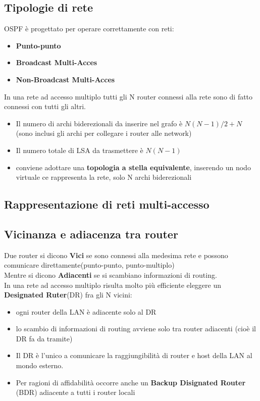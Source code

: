 \documentclass{report}
\begin{document}
            \subsection{Tipologie di rete}
                OSPF è progettato per operare correttamente con reti:
                \begin{itemize}
                    \item \textbf{Punto-punto}
                    \item \textbf{Broadcast Multi-Acces}
                    \item \textbf{Non-Broadcast Multi-Acces}
                \end{itemize}
                In una rete ad accesso multiplo tutti gli N router connessi alla rete sono di fatto connessi con tutti gli altri.
                \begin{itemize}
                    \item Il numero di archi biderezionali da inserire nel grafo è $N(N-1)/2+N$ (sono inclusi gli archi per collegare i router alle network) 
                    \item Il numero totale di LSA da trasmettere è $N(N-1)$
                    \item conviene adottare una \textbf{topologia a stella equivalente}, inserendo un nodo virtuale ce rappresenta la rete, solo N archi biderezionali
                \end{itemize}
            \subsection{Rappresentazione di reti multi-accesso}
            \subsection{Vicinanza e adiacenza tra router}
                Due router si dicono \textbf{Vici} se sono connessi alla medesima rete e possono comunicare direttamente(punto-punto, punto-multiplo)
                \\
                Mentre si dicono \textbf{Adiacenti} se si scambiano informazioni di routing.
                \\
                In una rete ad accesso multiplo risulta molto più efficiente eleggere un \textbf{Designated Ruter}(DR) fra gli N vicini:
                \begin{itemize}
                    \item ogni router della LAN è adiacente solo al DR
                    \item lo scambio di informazioni di routing avviene solo tra router adiacenti (cioè il DR fa da tramite)
                    \item Il DR è l'unico a comunicare la raggiungibilità di router e host della LAN al mondo esterno.
                    \item Per ragioni di affidabilità occorre anche un \textbf{Backup Disignated Router} (BDR) adiacente a tutti i router locali
                \end{itemize}
\end{document}

